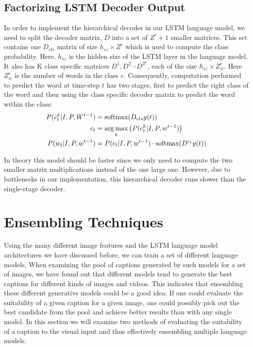 \subsection{Factorizing LSTM Decoder Output}
In order to implement the hierarchical decoder in our LSTM language model, we
need to split the decoder matrix, $D$ into a set of $Z^c+1$ smaller matrices.
This set contains one $D_{cls}$ matrix of size $h_{sz} \times Z^c$ which is
used to compute the class probability.
Here, $h_{sz}$ is the hidden size of the LSTM layer in the language model.
It also has K class specific matrices ${D^{1},D^{2}\cdots D^{Z^c}}$,
each of the size $h_{sz}\times Z_w^c$.
Here $Z_w^c$ is the number of words in the class $c$.
Consequently, computation performed to predict the word at time-step $t$ has two
stages, first to predict the right class of the word and then using the class
specific decoder matrix to predict the word within the class:
\begin{align}
        \label{eq:classLStmdecoder}
        P(c_{t}^{k}| I,P, W^{t-1}) &= \text{softmax}(D_{cls} y(t)) \\
        c_t &= \operatorname*{arg\,max}_k\left(P(c_{t}^k| I,P, w^{t-1})\right) \\
        P(w_t | I,P, w^{t-1}) &= P(c_t| I,P, w^{t-1}) \cdot \text{softmax}(D^{c_t} y(t))
\end{align}

In theory this model should be faster since we only need to compute the
two smaller matrix multiplications instead of the one large one.
However, due to bottlenecks in our implementation, this hierarchical decoder
runs slower than the single-stage decoder.
\section{Ensembling Techniques}
Using the many different image features and the LSTM language model
architectures we have discussed before, we can train a set of different language
models.
When examining the pool of captions generated by such models for a set of
images, we have found out that different models tend to generate the best
captions for different kinds of images and videos.
This indicates that ensembling these different generative models could be a good
idea.
If one could evaluate the suitability of a given caption for a
given image, one could possibly pick out the best candidate from the pool and
achieve better results than with any single model.
In this section we will examine two methods of evaluating the suitability
of a caption to the visual input and thus effectively ensembling multiple
language models.

